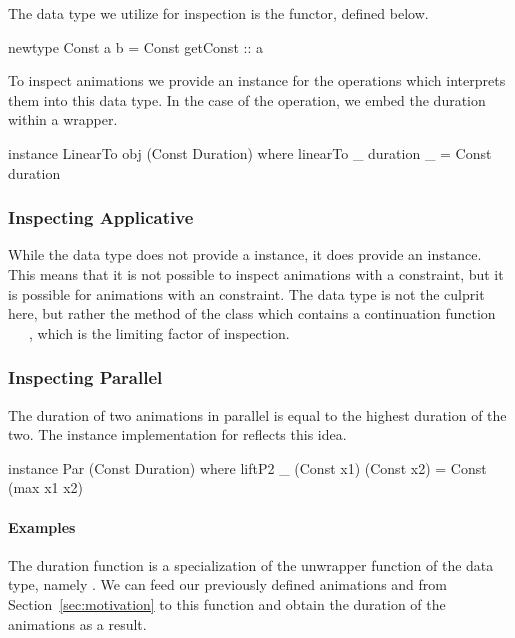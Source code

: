 The data type we utilize for inspection is the  functor, defined below.

\begin{spec}
newtype Const a b = Const { getConst :: a }
\end{spec}

To inspect animations we provide an instance for the operations which interprets them into this data type. In the case of the  operation, we embed the duration within a  wrapper.

\begin{code}
instance LinearTo obj (Const Duration) where
  linearTo _ duration _ = Const duration
\end{code}

\subsubsection{Inspecting Applicative}

While the  data type does not provide a  instance, it does provide an  instance. This means that it is not possible to inspect animations with a  constraint, but it is possible for animations with an  constraint. The  data type is not the culprit here, but rather the \hs{>>=} method of the  class which contains a continuation function ~\hs{->}~~, which is the limiting factor of inspection.

\subsubsection{Inspecting Parallel}

The duration of two animations in parallel is equal to the highest duration of the two. The  instance implementation for  reflects this idea. 

\begin{code}
instance Par (Const Duration) where
  liftP2 _ (Const x1) (Const x2) = Const (max x1 x2)
\end{code}

\paragraph{Examples}

The duration function is a specialization of the unwrapper function of the  data type, namely . We can feed our previously defined animations  and  from Section~\ref{sec:motivation} to this function and obtain the duration of the animations as a result.

